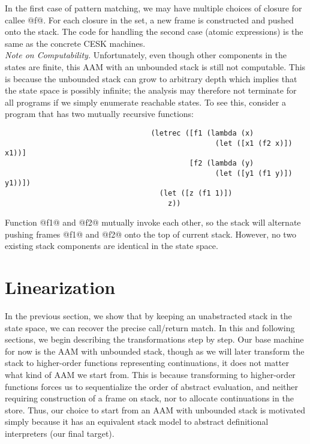 \documentclass[acmsmall, review]{acmart}\settopmatter{}
\begin{document}
In the first case of pattern matching, we may have multiple choices of closure for callee @f@.
For each closure in the set, a new frame is constructed and pushed onto the stack.
The code for handling the second case (atomic expressions) is the same as the concrete CESK machines. \\

\textit{Note on Computability.}
Unfortunately, even though other components in the states are finite,
this AAM with an unbounded stack is still not computable.
This is because the unbounded stack can grow to arbitrary depth which implies that the state
space is possibly infinite; the analysis may therefore not terminate for all programs if we
simply enumerate reachable states. To see this, consider a program that has two mutually
recursive functions:

\begin{lstlisting}
                                  (letrec ([f1 (lambda (x)
                                                 (let ([x1 (f2 x)]) x1))]
                                           [f2 (lambda (y)
                                                 (let ([y1 (f1 y)]) y1))])
                                    (let ([z (f1 1)])
                                      z))
\end{lstlisting}

Function @f1@ and @f2@ mutually invoke each other, so the stack will
alternate pushing frames @f1@ and @f2@ onto the top of current stack.
However, no two existing stack components are identical in the state space.

\section{Linearization} \label{linear}

In the previous section, we show that by keeping an unabstracted stack in the state
space, we can recover the precise call/return match.
In this and following sections, we begin describing the transformations step by step.
Our base machine for now is the AAM with unbounded stack, though
as we will later transform the stack to higher-order functions
representing continuations, it does not matter what kind of AAM we start from.
This is because transforming to higher-order functions forces us to sequentialize
the order of abstract evaluation, and neither requiring construction of a frame on stack,
nor to allocate continuations in the store.
Thus, our choice to start from an AAM with unbounded stack is motivated simply because
it has an equivalent stack model to abstract definitional interpreters (our final target).
\end{document}
